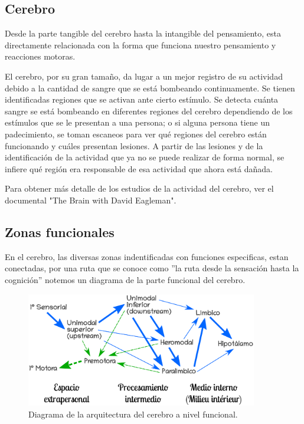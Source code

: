 \subsection{Cerebro}

Desde la parte tangible del cerebro hasta la intangible del pensamiento, esta directamente relacionada con la forma que funciona nuestro pensamiento y reacciones motoras.

El cerebro, por su gran tamaño, da lugar a un mejor registro de su actividad debido a la cantidad de sangre que se está bombeando continuamente. Se tienen identificadas regiones que se activan ante cierto estímulo.\cite{neurona_A_cerebro} Se detecta cuánta sangre se está bombeando en diferentes regiones del cerebro dependiendo de los estímulos que se le presentan a una persona; o si alguna persona tiene un padecimiento, se toman escaneos para ver qué regiones del cerebro están funcionando y cuáles presentan lesiones. A partir de las lesiones y de la identificación de la actividad que ya no se puede realizar de forma normal, se infiere qué región era responsable de esa actividad que ahora está dañada.\cite{estudiosF}

Para obtener más detalle de los estudios de la actividad del cerebro, ver el documental "The Brain with David Eagleman".

\subsection{Zonas funcionales}

En el cerebro, las diversas zonas indentificadas con funciones especificas, estan conectadas, por una ruta que se conoce como 
 ''la ruta desde la sensación hasta la cognición'' notemos un diagrama de la parte funcional del cerebro. \cite{sensAcogn}  


 \begin{figure}[h]
  \centering
  \includegraphics[width=0.9\textwidth]{../Figuras/zonasFuncionales.png}
  \caption{Diagrama de la arquitectura del cerebro a nivel funcional. \parencite{Mesulam1998}}
  \label{fig:zonasFun}
 \end{figure}

